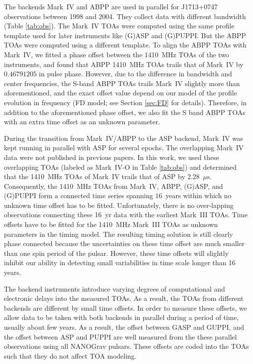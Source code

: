 {\bfref 
The backends Mark~IV and ABPP are used in parallel for J1713+0747 
observations between 1998 and 2004. They collect data with different bandwidth (Table
\ref{tab:obs}). The Mark~IV TOAs were computed using
the same profile template used for later instruments like (G)ASP and (G)PUPPI. 
But the ABPP TOAs were computed using a different template.
To align the ABPP TOAs with Mark~IV, we
fitted a phase offset between the 1410~MHz TOAs of the two instruments, and found
that ABPP 1410~MHz TOAs trails that of Mark~IV by $0.46791205$ in pulse phase.
However, due to the difference in bandwidth and center frequencies, the S-band
ABPP TOAs trails Mark~IV slightly more than aforementioned, and the exact
offset value depend on our model of the profile evolution in frequency (FD
model; see Section \ref{sec:FD} for details). Therefore, in
addition to the aforementioned phase offset, we also 
fit the S band ABPP TOAs with an extra time offset as an unknown parameter.

During the transition from Mark~IV/ABPP to the ASP backend, Mark~IV
was kept running in parallel with ASP for several epochs. 
The overlapping Mark~IV data were not published in previous papers. 
In this work, we used these overlapping TOAs (labeled as Mark~IV-O in Table \ref{tab:obs}) 
and determined that the 1410~MHz TOAs of Mark~IV trails that of ASP by
2.28~$\mu$s. Consequently, the
1410~MHz TOAs from Mark~IV, ABPP, (G)ASP, and (G)PUPPI form a connected time
series spanning 16~years within which no unknown time offset has to be fitted. 
Unfortunately, there is no
over-lapping observations connecting these 16~yr data with the earliest  Mark~III TOAs. 
Time offsets have to be
fitted for the 1410~MHz Mark~III TOAs as unknown parameters in the timing
model. The resulting timing solution is still
clearly phase connected because the uncertainties on these time offset are
much
smaller than one spin period of the pulsar. However, these time offsets will
slightly inhibit our ability in detecting small variabilities in time scale longer 
than 16 years.

The backend instruments introduce varying degrees of computational
and electronic delays into the measured TOAs. 
As a result, the TOAs from different backends are different by small time
offsets.
In order to measure these offsets, we allow data to be taken 
with both backends in parallel during a period of time, usually about few years.
As a result, the offset between GASP and GUPPI, and the offset between ASP and
PUPPI are well measured from the these parallel observations using all NANOGrav
pulsars. These offsets are coded into the TOAs such that they do not affect
TOA modeling. 


}

